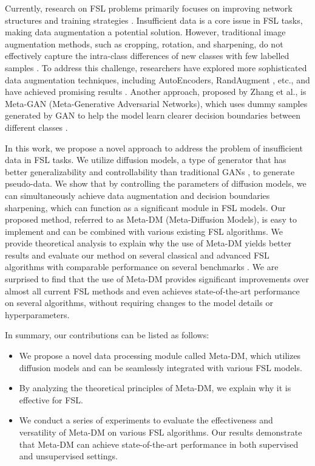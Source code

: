 \documentclass{article}
\begin{document}
Currently, research on FSL problems primarily focuses on improving network structures and training strategies \cite{i1,i2,i4,i9,i11,i14,i16,i6,i15,i17}. Insufficient data is a core issue in FSL tasks, making data augmentation a potential solution. However, traditional image augmentation methods, such as cropping, rotation, and sharpening, do not effectively capture the intra-class differences of new classes with few labelled samples \cite{i34}. To address this challenge, researchers have explored more sophisticated data augmentation techniques, including AutoEncoders, RandAugment \cite{i20}, etc., and have achieved promising results \cite{i10,i22}. Another approach, proposed by Zhang et al., is Meta-GAN (Meta-Generative Adversarial Networks), which uses dummy samples generated by GAN to help the model learn clearer decision boundaries between different classes \cite{i3}. 


In this work, we propose a novel approach to address the problem of insufficient data in FSL tasks.  We utilize diffusion models, a type of generator that has better generalizability and controllability than traditional GANs \cite{i21,i26,i27,i28}, to generate pseudo-data.  We show that by controlling the parameters of diffusion models, we can simultaneously achieve data augmentation and decision boundaries sharpening, which can function as a significant module in FSL models.  Our proposed method, referred to as Meta-DM (Meta-Diffusion Models), is easy to implement and can be combined with various existing FSL algorithms.  We provide theoretical analysis to explain why the use of Meta-DM yields better results and evaluate our method on several classical and advanced FSL algorithms with comparable performance on several benchmarks \cite{i1,i7,i8,i10}.  We are surprised to find that the use of Meta-DM provides significant improvements over almost all current FSL methods and even achieves state-of-the-art performance on several algorithms, without requiring changes to the model details or hyperparameters. 


In summary, our contributions can be listed as follows:


\begin{itemize}
	
	
	\item We propose a novel data processing module called Meta-DM, which utilizes diffusion models and can be seamlessly integrated with various FSL models.
	
	
	\item By analyzing the theoretical principles of Meta-DM, we explain why it is effective for FSL.
	
	
	\item We conduct a series of experiments to evaluate the effectiveness and versatility of Meta-DM on various FSL algorithms. Our results demonstrate that Meta-DM can achieve state-of-the-art performance in both supervised and unsupervised settings. 
	
	
\end{itemize}
\end{document}
